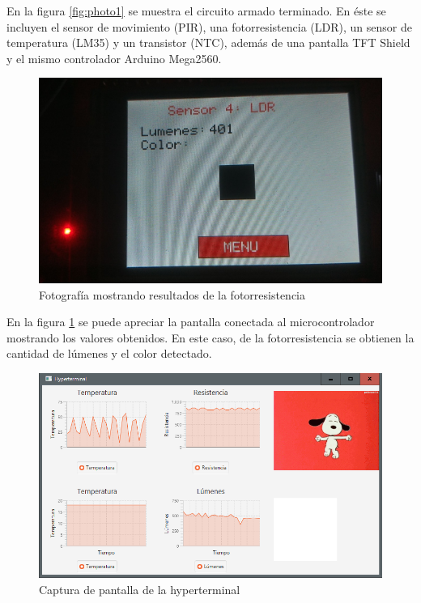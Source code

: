 \documentclass[conference]{IEEEtran}
\begin{document}
En la figura \ref{fig:photo1} se muestra el circuito armado terminado. En éste se incluyen el sensor de movimiento (PIR), una fotorresistencia (LDR), un sensor de temperatura (LM35) y un transistor (NTC), además de una pantalla TFT Shield y el mismo controlador Arduino Mega2560.

\begin{figure}
  \includegraphics[width=\linewidth]{fig5_photo_Screen.png}
  \caption{Fotografía mostrando resultados de la fotorresistencia}
  \label{fig:photo2}
\end{figure}

En la figura \ref{fig:photo2} se puede apreciar la pantalla conectada al microcontrolador mostrando los valores obtenidos. En este caso, de la fotorresistencia se obtienen la cantidad de lúmenes y el color detectado.

\begin{figure}
  \includegraphics[width=\linewidth]{fig3_screenshot_Hyperterminal.png}
  \caption{Captura de pantalla de la hyperterminal}
  \label{fig:screenshot1}
\end{figure}
\end{document}
